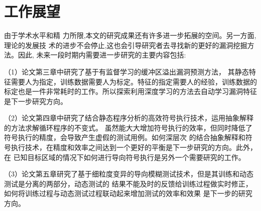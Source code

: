 \section{工作展望}
由于学术水平和精
力所限,本文的研究成果还有许多进一步拓展的空间。另一方面,理论的发展技
术的进步不会停止,这也会引导研究者去寻找新的更好的漏洞挖掘方法。因此,
未来一段时期内需要进一步研究的主要内容包括:

（1）论文第三章中研究了基于有监督学习的缓冲区溢出漏洞预测方法，
其静态特征需要人为指定，训练数据需要人为标定。特征的指定需要人的经验，训练数据的
标定也是一件非常耗时的工作。所以探索利用深度学习的方法去自动学习漏洞特征是下一步研究方向。

（2）论文第四章中研究了结合静态程序分析的高效符号执行技术，运用抽象解释的方法求解循环程序的不变式。
虽然能大大增加符号执行的效率，但同时降低了符号执行的精度，会导致产生虚假的测试用例。如何深层次
的结合抽象解释和符号执行技术，在精度和效率之间达到一个更好的平衡是下一步研究的方向。此外，在
已知目标区域的情况下如何进行导向符号执行是另外一个需要研究的工作。

（3）论文第五章研究了基于细粒度变异的导向模糊测试技术，但是其训练和动态测试是分离的两部分，动态测试的
结果不能及时的反馈给训练过程做实时修正，如何将训练过程与动态测试过程联动起来增加测试的效率和效果
是下一步的研究方向。
